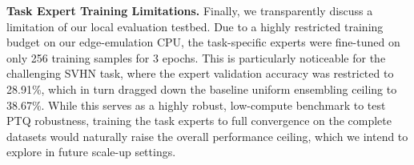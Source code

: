 \textbf{Task Expert Training Limitations.}
Finally, we transparently discuss a limitation of our local evaluation testbed. Due to a highly restricted training budget on our edge-emulation CPU, the task-specific experts were fine-tuned on only 256 training samples for 3 epochs. This is particularly noticeable for the challenging SVHN task, where the expert validation accuracy was restricted to 28.91\%, which in turn dragged down the baseline uniform ensembling ceiling to 38.67\%. While this serves as a highly robust, low-compute benchmark to test PTQ robustness, training the task experts to full convergence on the complete datasets would naturally raise the overall performance ceiling, which we intend to explore in future scale-up settings.
